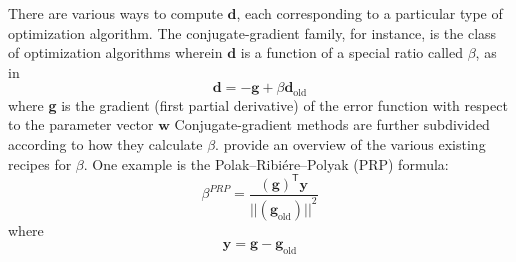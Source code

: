 There are various ways to compute $\textbf{d}$, each corresponding to a 
particular type of optimization algorithm. The conjugate-gradient family, 
for instance, is the class of optimization algorithms wherein $\textbf{d}$ is a function 
of a special ratio called $\beta$, as in
\begin{equation}\label{eq:basic-d}
\textbf{d}= -\textbf{g}  + \beta \textbf{d}_{\text{old}} 
\end{equation}
where \textbf{g} is the gradient (first partial derivative) of the error function with respect to the parameter vector $\textbf{w}$ 
Conjugate-gradient methods are further subdivided according to how they calculate $\beta$.
\citet{hager:2006} provide an overview of the various existing recipes for $\beta$.
One example is the Polak--Ribi\'{e}re--Polyak (PRP) formula:
\begin{equation}\label{eq:PRP}
\beta^{PRP} = \frac{(\textbf{g})^{\textsf{T}}{\textbf{y}}}{{||(\textbf{g}_{\text{old}})||}^2}
\end{equation}
where
\begin{equation}\label{eq:y}
\textbf{y} = \textbf{g} - \textbf{g}_{\text{old}} 
\end{equation}

